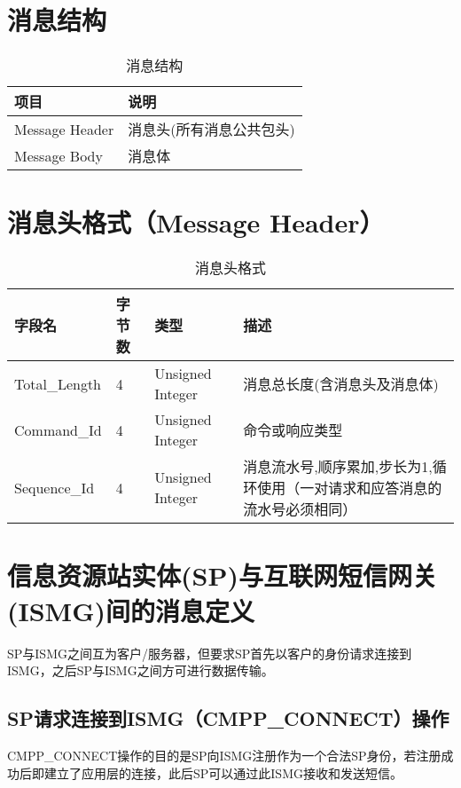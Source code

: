 \documentclass[11pt]{book} %
\begin{document}
\section{消息结构}

\begin{table}[htbp]
\centering
\caption{消息结构}
\begin{tabular}{|m{80pt}|m{250pt}|}
\hline
项目 &说明\\
\hline
Message Header& 消息头(所有消息公共包头)\\
\hline
Message Body& 消息体\\
\hline
\end{tabular}
\end{table}


\section{消息头格式（Message Header）}


\begin{table}[htbp]
\centering
\caption{消息头格式}
\begin{tabular}{|m{60pt}|m{40pt}|m{85pt}|m{120pt}|}
\hline
字段名 & 字节数& 类型& 描述\\
\hline
Total\_Length	& 4 & Unsigned  Integer& 消息总长度(含消息头及消息体)\\
\hline
Command\_Id & 4 & Unsigned Integer & 命令或响应类型 \\
\hline
Sequence\_Id& 4 & Unsigned Integer& 消息流水号,顺序累加,步长为1,循环使用（一对请求和应答消息的流水号必须相同）\\
\hline
\end{tabular}
\end{table}




\section{信息资源站实体(SP)与互联网短信网关(ISMG)间的消息定义}

SP与ISMG之间互为客户/服务器，但要求SP首先以客户的身份请求连接到ISMG，之后SP与ISMG之间方可进行数据传输。


\subsection{SP请求连接到ISMG（CMPP\_CONNECT）操作	}


CMPP\_CONNECT操作的目的是SP向ISMG注册作为一个合法SP身份，若注册成功后即建立了应用层的连接，此后SP可以通过此ISMG接收和发送短信。
\end{document}
